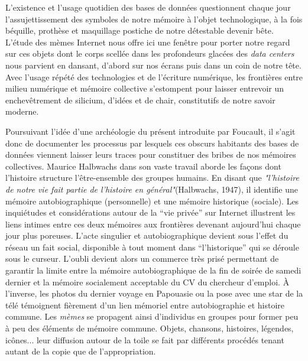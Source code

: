 L{\textquoteright}existence et l{\textquoteright}usage quotidien des bases de donn\'ees questionnent chaque jour l{\textquoteright}assujettissement des symboles de notre m\'emoire \`a l{\textquoteright}objet technologique, \`a la fois b\'equille, proth\`ese et maquillage postiche de notre d\'etestable devenir b\^ete. L{\textquoteright}\'etude des m\`emes Internet nous offre ici une fen\^etre pour porter notre regard sur ces objets dont le corps scell\'ee dans les profondeurs glac\'ees des \textit{data centers }nous parvient en dansant, d{\textquoteright}abord sur nos \'ecrans puis dans un coin de notre t\^ete. Avec l{\textquoteright}usage r\'ep\'et\'e des technologies et de l{\textquoteright}\'ecriture num\'erique, les fronti\`eres entre milieu num\'erique et m\'emoire collective s{\textquoteright}estompent pour laisser entrevoir un enchev\^etrement de silicium, d{\textquoteright}id\'ees et de chair, constitutifs de notre savoir moderne. 

Poursuivant l{\textquoteright}id\'ee d{\textquoteright}une arch\'eologie du pr\'esent introduite par Foucault, il s{\textquoteright}agit donc de documenter les processus par lesquels ces obscurs habitants des bases de donn\'ees viennent laisser leurs traces pour constituer des bribes de nos m\'emoires collectives. Maurice Halbwachs dans son vaste travail aborde les fa\c{c}ons dont l{\textquoteright}histoire structure l{\textquoteright}\^etre-ensemble des groupes humains. En disant que \textit{"l'histoire de notre vie fait partie de l'histoire en général"}(Halbwachs, 1947), il identifie une m\'emoire autobiographique (personnelle) et une m\'emoire historique (sociale). Les inqui\'etudes et consid\'erations autour de la {\textquotedblleft}vie priv\'ee{\textquotedblright} sur Internet illustrent les liens intimes entre ces deux m\'emoires aux fronti\`eres devenant aujourd{\textquoteright}hui chaque jour plus poreuses. L{\textquoteright}acte singulier et autobiographique devient sous l{\textquoteright}effet du r\'eseau un fait social, disponible \`a tout moment dans {\textquotedblleft}l{\textquoteright}historique{\textquotedblright} qui se d\'eroule sous le curseur. L{\textquoteright}oubli devient alors un commerce tr\`es pris\'e permettant de garantir la limite entre la m\'emoire autobiographique de la fin de soir\'ee de samedi dernier et la m\'emoire socialement acceptable du CV du chercheur d{\textquoteright}emploi. \`A l{\textquoteright}inverse, les photos du dernier voyage en Papouasie ou la pose avec une star de la t\'el\'e t\'emoignent fi\`erement d{\textquoteright}un lien m\'emoriel entre autobiographie et histoire commune. Les \textit{m\`emes} se propagent ainsi d{\textquoteright}individus en groupes pour former peu \`a peu des \'el\'ements de m\'emoire commune. Objets, chansons, histoires, l\'egendes, ic\^ones... leur diffusion autour de la toile se fait par diff\'erents proc\'ed\'es tenant autant de la copie que de l{\textquoteright}appropriation. 


